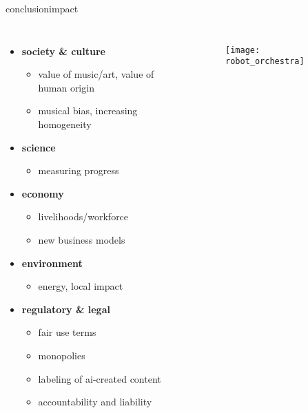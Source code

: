
\begin{frame}{conclusion}{impact}
    \vspace{-8mm}
    \begin{columns}
    \begin{itemize}
        \item \textbf{society \& culture}
            \begin{itemize}
                \item value of music/art, value of human origin
                \item musical bias, increasing homogeneity
            \end{itemize}
        \item \textbf{science} 
            \begin{itemize}
                \item measuring progress
            \end{itemize}
        \item \textbf{economy}
            \begin{itemize}
                \item livelihoods/workforce
                \item new business models
            \end{itemize}
        \item \textbf{environment}
            \begin{itemize}
                \item energy, local impact
            \end{itemize}
        \item \textbf{regulatory \& legal}
                \begin{itemize}
                    \item fair use terms
                    \item monopolies
                    \item labeling of ai-created content
                    \item accountability and liability
                \end{itemize}
    \end{itemize}
        \vspace{10mm}
        \begin{figure}%
            \texttt{[image: robot\_orchestra]}%
        \end{figure}
    \end{columns}
\end{frame}

